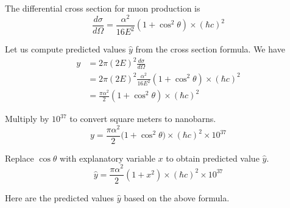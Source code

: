 \documentclass[12pt]{article}
\begin{document}
The differential cross section for muon production is
\begin{equation*}
\frac{d\sigma}{d\Omega}=\frac{\alpha^2}{16E^2}\left(1+\cos^2\theta\right)\times(\hbar c)^2
\end{equation*}

Let us compute predicted values $\hat{y}$ from the cross section formula.
We have
\begin{align*}
y&=2\pi(2E)^2\frac{d\sigma}{d\Omega}
\\
&=2\pi(2E)^2\frac{\alpha^2}{16E^2}\left(1+\cos^2\theta\right)\times(\hbar c)^2
\\
&=\frac{\pi\alpha^2}{2}\left(1+\cos^2\theta\right)\times(\hbar c)^2
\end{align*}

Multiply by $10^{37}$ to convert square meters to nanobarns.
\begin{equation*}
y=\frac{\pi\alpha^2}{2}\big(1+\cos^2\theta\big)\times(\hbar c)^2\times10^{37}
\end{equation*}

Replace $\cos\theta$ with explanatory variable $x$ to obtain predicted value $\hat{y}$.
\begin{equation*}
\hat{y}=\frac{\pi\alpha^2}{2}\left(1+x^2\right)\times(\hbar c)^2\times10^{37}
\end{equation*}

Here are the predicted values $\hat{y}$ based on the above formula.
\end{document}
